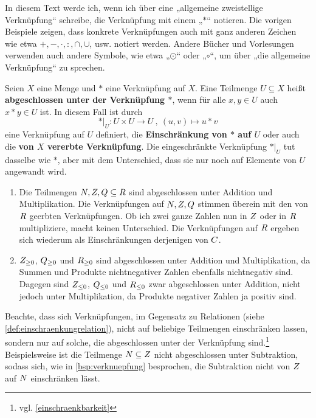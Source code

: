 \begin{nota}[Verknüpfungssymbole]
    In diesem Text werde ich, wenn ich über eine „allgemeine zweistellige Verknüpfung“ schreibe, die Verknüpfung mit einem „$*$“ notieren. Die vorigen Beispiele zeigen, dass konkrete Verknüpfungen auch mit ganz anderen Zeichen wie etwa $+,-,\cdot,:,\cap,\cup$, usw. notiert werden. Andere Bücher und Vorlesungen verwenden auch andere Symbole, wie etwa „$\odot$“ oder „$\circ$“, um über „die allgemeine Verknüpfung“ zu sprechen.
\end{nota}


\begin{defin}  
    Seien $X$ eine Menge und $*$ eine Verknüpfung auf $X$. Eine Teilmenge $U\subseteq X$ heißt \textbf{abgeschlossen unter der Verknüpfung $*$}, wenn für alle $x,y\in U$ auch $x*y\in U$ ist. In diesem Fall ist durch
        \[ *\vert_U : U\times U \to U \ ,\ (u,v) \mapsto u*v \]
    eine Verknüpfung auf $U$ definiert, die \textbf{Einschränkung von $*$ auf $U$} oder auch die \textbf{von $X$ vererbte Verknüpfung}. Die eingeschränkte Verknüpfung $*\vert_U$ tut dasselbe wie $*$, aber mit dem Unterschied, dass sie nur noch auf Elemente von $U$ angewandt wird.
\end{defin}


\begin{bsp} \quad
    \begin{enumerate}
        \item Die Teilmengen $\relax N,\relax Z,\relax Q\subseteq \relax R$ sind abgeschlossen unter Addition und Multiplikation. Die Verknüpfungen auf $\relax N,\relax Z,\relax Q$ stimmen überein mit den von $\relax R$ geerbten Verknüpfungen. Ob ich zwei ganze Zahlen nun in $\relax Z$ oder in $\relax R$ multipliziere, macht keinen Unterschied. Die Verknüpfungen auf $\relax R$ ergeben sich wiederum als Einschränkungen derjenigen von $\relax C$.
        \item $\relax Z_{\ge 0}$, $\relax Q_{\ge 0}$ und $\relax R_{\ge 0}$ sind abgeschlossen unter Addition und Multiplikation, da Summen und Produkte nichtnegativer Zahlen ebenfalls nichtnegativ sind. Dagegen sind $\relax Z_{\le 0}$, $\relax Q_{\le 0}$ und $\relax R_{\le 0}$ zwar abgeschlossen unter Addition, nicht jedoch unter Multiplikation, da Produkte negativer Zahlen ja positiv sind.
    \end{enumerate}
\end{bsp}


\begin{bem}
    Beachte, dass sich Verknüpfungen, im Gegensatz zu Relationen (siehe \cref{def:einschraenkungrelation}), nicht auf beliebige Teilmengen einschränken lassen, sondern nur auf solche, die abgeschlossen unter der Verknüpfung sind.\footnote{vgl. \cref{einschraenkbarkeit}} Beispielsweise ist die Teilmenge $\relax N\subseteq \relax Z$ nicht abgeschlossen unter Subtraktion, sodass sich, wie in \cref{bsp:verknuepfung} besprochen, die Subtraktion nicht von $\relax Z$ auf $\relax N$ einschränken lässt.
\end{bem}



